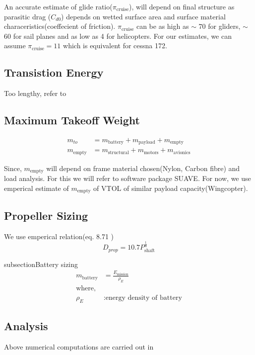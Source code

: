 An accurate estimate of glide ratio($\pi_\text{cruise}$)\cite{Lifttodr0:online}, will depend on final structure as parasitic drag ($C_{d0}$) depends on wetted surface area and surface material characeristics(coeffecient of friction). $\pi_\text{cruise}$ can be as high as $\sim$ 70 for gliders, $\sim$ 60 for sail planes and as low as 4 for helicopters. For our estimates, we can assume $\pi_\text{cruise}=11$ which is equivalent for cessna 172.

\subsection{Transistion Energy}
Too lengthy, refer to \cite{kamal2018design}

\subsection{Maximum Takeoff Weight}
\begin{align*}
    m_{to} &= m_{\text{battery}} + m_{\text{payload}} + m_{\text{empty}}\\
    m_{\text{empty}} &= m_{\text{structural}} + m_{\text{motors}} + m_{\text{avionics}}
\end{align*}

Since, $m_{\text{empty}}$ will depend on frame material chosen(Nylon, Carbon fibre) and load analysis. For this we will refer to software package SUAVE\cite{lukaczyk2015suave}. For now, we use emperical estimate of $m_{\text{empty}}$ of VTOL of similar payload capacity(Wingcopter).

\subsection{Propeller Sizing}

We use emperical relation(eq. 8.71 \cite{anderson1999aircraft})
\begin{equation*}
    D_{prop} = 10.7 P_\text{shaft}^\frac{1}{4}
\end{equation*}

subsection{Battery sizing}
\begin{align*}
    m_\text{battery} &= \frac{E_\text{mission}}{\rho_E}\\
    \text{where,}\\
    \rho_E &: \text{energy density of battery}
\end{align*}

\subsection{Analysis}
Above numerical computations are carried out in \cite{VTOLdesi25:online}

